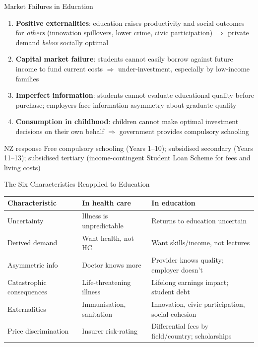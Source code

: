 \documentclass[aspectratio=169, 12pt]{beamer}
\begin{document}
\begin{frame}{Market Failures in Education}
  \footnotesize
  \begin{enumerate}
    \item \textbf{Positive externalities}: education raises productivity and social outcomes
          for \emph{others} (innovation spillovers, lower crime, civic participation)
          $\Rightarrow$ private demand \emph{below} socially optimal
    \item \textbf{Capital market failure}: students cannot easily borrow against future income
          to fund current costs $\Rightarrow$ under-investment, especially by low-income families
    \item \textbf{Imperfect information}: students cannot evaluate educational quality before
          purchase; employers face information asymmetry about graduate quality
    \item \textbf{Consumption in childhood}: children cannot make optimal investment decisions
          on their own behalf $\Rightarrow$ government provides compulsory schooling
  \end{enumerate}
  \begin{exampleblock}{NZ response}
    \footnotesize Free compulsory schooling (Years 1--10); subsidised secondary (Years 11--13);
    subsidised tertiary (income-contingent Student Loan Scheme for fees and living costs)
  \end{exampleblock}
\end{frame}

\begin{frame}{The Six Characteristics Reapplied to Education}
  \begin{center}
    \footnotesize
    \begin{tabular}{@{}p{3.0cm}p{4.2cm}p{4.2cm}@{}}
      \toprule
      \textbf{Characteristic} & \textbf{In health care} & \textbf{In education} \\
      \midrule
      Uncertainty & Illness is unpredictable & Returns to education uncertain \\
      Derived demand & Want health, not HC & Want skills/income, not lectures \\
      Asymmetric info & Doctor knows more & Provider knows quality; employer doesn't \\
      Catastrophic consequences & Life-threatening illness & Lifelong earnings impact; student debt \\
      Externalities & Immunisation, sanitation & Innovation, civic participation, social cohesion \\
      Price discrimination & Insurer risk-rating & Differential fees by field/country; scholarships \\
      \bottomrule
    \end{tabular}
  \end{center}
\end{frame}
\end{document}
